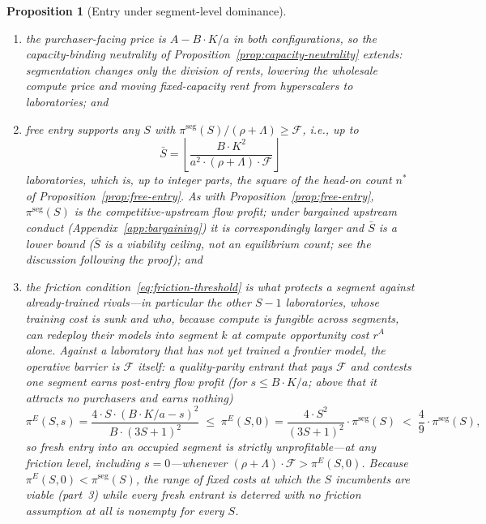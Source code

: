 \documentclass[11pt]{article}
\newtheorem{proposition}{Proposition}
\begin{document}
\begin{proposition}[Entry under segment-level dominance]
\begin{enumerate}
\begin{equation}\pi^{\mathrm{seg}}(S)=\frac{B\cdot K^{2}}{a^{2}\cdot S},\end{equation}
which is $S$ times what each of the same $S$ laboratories would earn competing head-on for the whole market;
\item the purchaser-facing price is $A-B\cdot K/a$ in both configurations, so the capacity-binding neutrality of Proposition~\ref{prop:capacity-neutrality} extends: segmentation changes only the division of rents, lowering the wholesale compute price and moving fixed-capacity rent from hyperscalers to laboratories; and
\item free entry supports any $S$ with $\pi^{\mathrm{seg}}(S)/(\rho+\Lambda)\geq\mathcal F$, i.e., up to
\begin{equation}\bar S=\left\lfloor\frac{B\cdot K^{2}}{a^{2}\cdot(\rho+\Lambda)\cdot\mathcal F}\right\rfloor\end{equation}
laboratories, which is, up to integer parts, the \emph{square} of the head-on count $n^{*}$ of Proposition~\ref{prop:free-entry}. As with Proposition~\ref{prop:free-entry}, $\pi^{\mathrm{seg}}(S)$ is the competitive-upstream flow profit; under bargained upstream conduct (Appendix~\ref{app:bargaining}) it is correspondingly larger and $\bar S$ is a lower bound ($\bar S$ is a viability ceiling, not an equilibrium count; see the discussion following the proof); and
\item the friction condition~\eqref{eq:friction-threshold} is what protects a segment against \emph{already-trained} rivals---in particular the other $S-1$ laboratories, whose training cost is sunk and who, because compute is fungible across segments, can redeploy their models into segment $k$ at compute opportunity cost $r^{A}$ alone. Against a laboratory that has \emph{not yet} trained a frontier model, the operative barrier is $\mathcal F$ itself: a quality-parity entrant that pays $\mathcal F$ and contests one segment earns post-entry flow profit (for $s\leq B\cdot K/a$; above that it attracts no purchasers and earns nothing)
\begin{equation}\label{eq:entrant-duopoly-profit}\pi^{E}(S,s)=\frac{4\cdot S\cdot\left(B\cdot K/a-s\right)^{2}}{B\cdot(3S+1)^{2}}\;\leq\;\pi^{E}(S,0)=\frac{4\cdot S^{2}}{(3S+1)^{2}}\cdot\pi^{\mathrm{seg}}(S)\;<\;\frac{4}{9}\cdot\pi^{\mathrm{seg}}(S),\end{equation}
so fresh entry into an occupied segment is strictly unprofitable---at \emph{any} friction level, including $s=0$---whenever $(\rho+\Lambda)\cdot\mathcal F>\pi^{E}(S,0)$. Because $\pi^{E}(S,0)<\pi^{\mathrm{seg}}(S)$, the range of fixed costs at which the $S$ incumbents are viable (part~3) while every fresh entrant is deterred with no friction assumption at all is nonempty for every $S$.
\end{enumerate}
\end{proposition}
\end{document}
